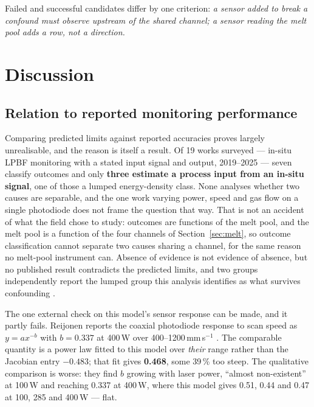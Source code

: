 \documentclass[preprint,times]{elsarticle}
\begin{document}
Failed and successful candidates differ by one criterion: \emph{a sensor added to
break a confound must observe upstream of the shared channel; a sensor reading
the melt pool adds a row, not a direction.}

\section{Discussion}

\subsection{Relation to reported monitoring performance}

Comparing predicted limits against reported accuracies proves largely
unrealisable, and the reason is itself a result. Of 19 works surveyed --- in-situ
LPBF monitoring with a stated input signal and output, 2019--2025 --- seven
classify outcomes and only \textbf{three estimate a process input from an in-situ
signal}, one of those a lumped energy-density class. None analyses whether two
causes are separable, and the one work varying power, speed and gas flow on a
single photodiode \cite{Reijonen2024} does not frame the question that way. That is not an accident of what the field chose
to study: outcomes are functions of the melt pool, and the melt pool is a
function of the four channels of Section~\ref{sec:melt}, so outcome
classification cannot separate two causes sharing a channel, for the same reason
no melt-pool instrument can. Absence of evidence is not evidence of absence, but
no published result contradicts the predicted limits, and two groups
independently report the lumped group this analysis identifies as what survives
confounding \cite{Blanc2024,kNN2025}.

The one external check on this model's sensor response can be made, and it
partly fails. Reijonen reports the coaxial photodiode response to scan speed as
$y=ax^{-b}$ with $b=0.337$ at 400\,W over 400--1200\,mm\,s$^{-1}$
\cite{Reijonen2024}. The comparable quantity is a power law fitted to this model
over \emph{their} range rather than the Jacobian entry $-0.483$; that fit gives
\textbf{0.468}, some 39\,\% too steep. The qualitative comparison is worse: they
find $b$ growing with laser power, ``almost non-existent'' at 100\,W and
reaching 0.337 at 400\,W, where this model gives 0.51, 0.44 and 0.47 at 100, 285
and 400\,W --- flat.
\end{document}
